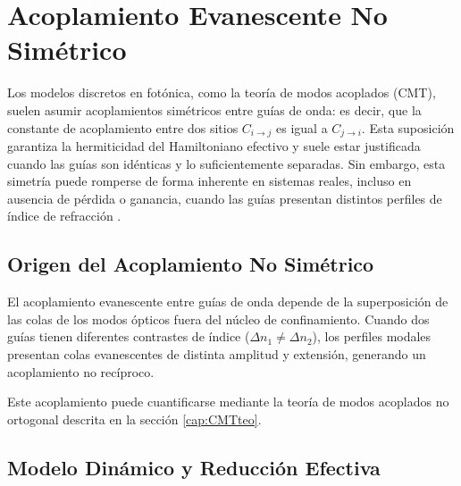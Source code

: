 \chapter{Acoplamiento Evanescente No Simétrico}
\label{cap:asymmetric}

Los modelos discretos en fotónica, como la teoría de modos acoplados (CMT), suelen asumir acoplamientos simétricos entre guías de onda: es decir, que la constante de acoplamiento entre dos sitios \( C_{i\to j} \) es igual a \( C_{j\to i} \). Esta suposición garantiza la hermiticidad del Hamiltoniano efectivo y suele estar justificada cuando las guías son idénticas y lo suficientemente separadas. Sin embargo, esta simetría puede romperse de forma inherente en sistemas reales, incluso en ausencia de pérdida o ganancia, cuando las guías presentan distintos perfiles de índice de refracción \cite{nonsymm}.

\section{Origen del Acoplamiento No Simétrico}

El acoplamiento evanescente entre guías de onda depende de la superposición de las colas de los modos ópticos fuera del núcleo de confinamiento. Cuando dos guías tienen diferentes contrastes de índice (\( \Delta n_1 \ne \Delta n_2 \)), los perfiles modales presentan colas evanescentes de distinta amplitud y extensión, generando un acoplamiento no recíproco.

Este acoplamiento puede cuantificarse mediante la teoría de modos acoplados no ortogonal descrita en la sección \ref{cap:CMTteo}.

\section{Modelo Dinámico y Reducción Efectiva}

